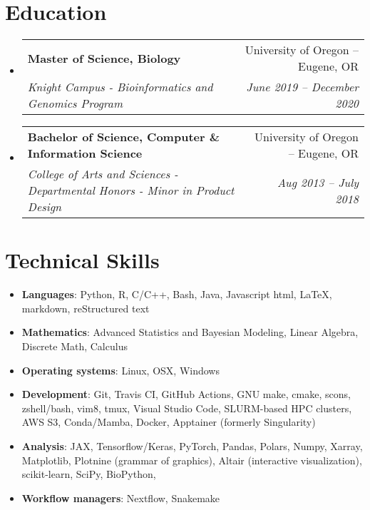 \documentclass[letterpaper,11pt]{article}
\makeatletter
\newcommand{\resumeNoWrapItem}[2]{
  \item\small{
    \textbf{#1}{: #2 \vspace{-2pt}}
  }
}
\newcommand{\resumeSubheading}[4]{
  \vspace{-1pt}\item
    \begin{tabular*}{0.97\textwidth}[t]{l@{\extracolsep{\fill}}r}
      \textbf{#1} & #2 \\
      \textit{\small#3} & \textit{\small #4} \\
    \end{tabular*}\vspace{-3pt}
}
\newcommand{\resumeSubItem}[2]{\resumeNoWrapItem{#1}{#2}\vspace{-4pt}}
\newcommand{\resumeSubHeadingListStart}{\begin{itemize}[leftmargin=*]}
\newcommand{\resumeSubHeadingListEnd}{\end{itemize}}
\makeatother
\begin{document}
\section{Education}
    \resumeSubHeadingListStart
        \resumeSubheading
            {Master of Science, Biology}{University of Oregon -- Eugene, OR}
            {Knight Campus - Bioinformatics and Genomics Program}{June 2019 -- December 2020}
        \resumeSubheading
            {Bachelor of Science, Computer \& Information Science}{University of Oregon -- Eugene, OR}
            {College of Arts and Sciences - Departmental Honors - Minor in Product Design}{Aug 2013 -- July 2018}
    \resumeSubHeadingListEnd

\section{Technical Skills}

\resumeSubHeadingListStart
    \resumeSubItem{Languages}
        {
            Python, R, C/C++, Bash, Java, Javascript
            html, \LaTeX, markdown, reStructured text
        }
    \resumeSubItem{Mathematics}
        {
            Advanced Statistics and Bayesian Modeling, 
            Linear Algebra, 
            Discrete Math, 
            Calculus
        }
    \resumeSubItem{Operating systems}
        {
            Linux, OSX, Windows
        }
    \resumeSubItem{Development}
        {
            Git, Travis CI, GitHub Actions, %
            GNU make, cmake, scons, %
            zshell/bash, vim8, tmux, %
            Visual Studio Code, 
            SLURM-based HPC clusters, 
            AWS S3, %
            Conda/Mamba, %
            Docker, Apptainer (formerly Singularity) %
        }
    \resumeSubItem{Analysis}
        {
            JAX, Tensorflow/Keras, PyTorch, 
            Pandas, Polars, Numpy, Xarray, 
            Matplotlib, Plotnine (grammar of graphics), Altair (interactive visualization),
            scikit-learn, SciPy, BioPython,
        }
    \resumeSubItem{Workflow managers}
        {
            Nextflow, Snakemake
        }
\resumeSubHeadingListEnd

    
\end{document}
